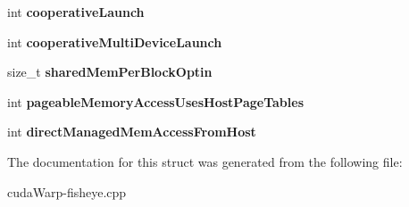 \begin{DoxyCompactItemize}
\item 
int {\bfseries cooperative\+Launch}\hypertarget{structcudaDeviceProp_a3c26ab51c96f39b115d7826337541914}{}\label{structcudaDeviceProp_a3c26ab51c96f39b115d7826337541914}

\item 
int {\bfseries cooperative\+Multi\+Device\+Launch}\hypertarget{structcudaDeviceProp_a83271637b431ccb5f5b58c46d0bd8cc9}{}\label{structcudaDeviceProp_a83271637b431ccb5f5b58c46d0bd8cc9}

\item 
size\+\_\+t {\bfseries shared\+Mem\+Per\+Block\+Optin}\hypertarget{structcudaDeviceProp_ac23eacaeeb59e1798d6d442be70f1c3e}{}\label{structcudaDeviceProp_ac23eacaeeb59e1798d6d442be70f1c3e}

\item 
int {\bfseries pageable\+Memory\+Access\+Uses\+Host\+Page\+Tables}\hypertarget{structcudaDeviceProp_ae9f1ed6bffd5606eb81d438728a844ca}{}\label{structcudaDeviceProp_ae9f1ed6bffd5606eb81d438728a844ca}

\item 
int {\bfseries direct\+Managed\+Mem\+Access\+From\+Host}\hypertarget{structcudaDeviceProp_ab47773cf29bec05e6f1ba569346889e8}{}\label{structcudaDeviceProp_ab47773cf29bec05e6f1ba569346889e8}

\end{DoxyCompactItemize}


The documentation for this struct was generated from the following file\+:\begin{DoxyCompactItemize}
\item 
cuda\+Warp-\/fisheye.\+cpp\end{DoxyCompactItemize}
